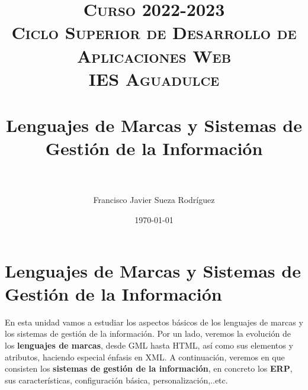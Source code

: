


\title{
\normalfont \normalsize
\textsc{{\bfseries Curso 2022-2023} \\ Ciclo Superior de Desarrollo de Aplicaciones Web \\ IES Aguadulce} \\ [25pt]
\horrule{0.5pt} \\[0.4cm]
\huge Lenguajes de Marcas y Sistemas de Gestión de la Información\\
\horrule{0.5pt} \\[0.4cm]
}

\author{Francisco Javier Sueza Rodríguez}
\date{\normalsize\today}


\makeglossaries
{}



\maketitle

\newpage

\tableofcontents

\newpage

\listoffigures


\newpage
\chapter{Lenguajes de Marcas y Sistemas de Gestión de la Información}
En esta unidad vamos a estudiar los aspectos básicos de los lenguajes de marcas y los sistemas de gestión de la información. Por un lado, veremos la evolución de los \textbf{lenguajes de marcas}, desde GML hasta HTML, así como sus elementos y atributos, haciendo especial énfasis en XML. A continuación, veremos en que consisten los \textbf{sistemas de gestión de la información}, en concreto los \textbf{ERP}, sus características, configuración básica, personalización,..etc.

